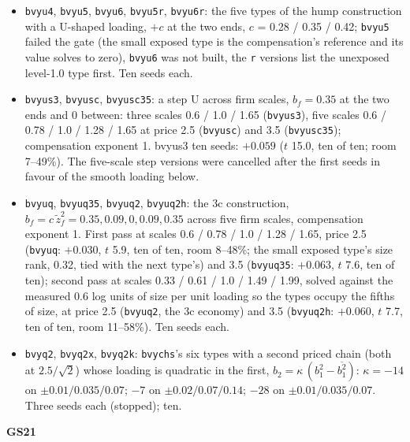 \documentclass[11pt]{article}
\begin{document}
\begin{itemize}
\item \texttt{bvyu4}, \texttt{bvyu5}, \texttt{bvyu6}, \texttt{bvyu5r}, \texttt{bvyu6r}: the five types of the hump construction with a U-shaped loading, $+c$ at the two ends, $c$ = 0.28 / 0.35 / 0.42; \texttt{bvyu5} failed the gate (the small exposed type is the compensation's reference and its value solves to zero), \texttt{bvyu6} was not built, the \texttt{r} versions list the unexposed level-1.0 type first. Ten seeds each.
\item \texttt{bvyus3}, \texttt{bvyusc}, \texttt{bvyusc35}: a step U across firm scales, $b_f = 0.35$ at the two ends and 0 between: three scales 0.6 / 1.0 / 1.65 (\texttt{bvyus3}), five scales 0.6 / 0.78 / 1.0 / 1.28 / 1.65 at price 2.5 (\texttt{bvyusc}) and 3.5 (\texttt{bvyusc35}); compensation exponent 1. bvyus3 ten seeds: $+0.059$ ($t$ 15.0, ten of ten; room 7--49\%). The five-scale step versions were cancelled after the first seeds in favour of the smooth loading below.
\item \texttt{bvyuq}, \texttt{bvyuq35}, \texttt{bvyuq2}, \texttt{bvyuq2h}: the 3c construction, $b_f = c\,\tilde z_f^2 = 0.35, 0.09, 0, 0.09, 0.35$ across five firm scales, compensation exponent 1. First pass at scales 0.6 / 0.78 / 1.0 / 1.28 / 1.65, price 2.5 (\texttt{bvyuq}: $+0.030$, $t$ 5.9, ten of ten, room 8--48\%; the small exposed type's size rank, 0.32, tied with the next type's) and 3.5 (\texttt{bvyuq35}: $+0.063$, $t$ 7.6, ten of ten); second pass at scales 0.33 / 0.61 / 1.0 / 1.49 / 1.99, solved against the measured 0.6 log units of size per unit loading so the types occupy the fifths of size, at price 2.5 (\texttt{bvyuq2}, the 3c economy) and 3.5 (\texttt{bvyuq2h}: $+0.060$, $t$ 7.7, ten of ten, room 11--58\%). Ten seeds each.
\item \texttt{bvyq2}, \texttt{bvyq2x}, \texttt{bvyq2k}: \texttt{bvychs}'s six types with a second priced chain (both at $2.5/\sqrt2$) whose loading is quadratic in the first, $b_2=\kappa\,(b_1^2-\overline{b_1^2})$: $\kappa=-14$ on $\pm0.01/0.035/0.07$; $-7$ on $\pm0.02/0.07/0.14$; $-28$ on $\pm0.01/0.035/0.07$. Three seeds each (stopped); ten.
\end{itemize}
\noindent\textbf{GS21}
\end{document}
